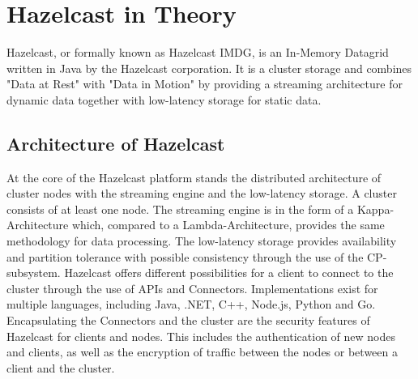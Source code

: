 
\section{Hazelcast in Theory}
Hazelcast, or formally known as Hazelcast IMDG, is an In-Memory Datagrid written in Java by the Hazelcast corporation. It is a cluster storage and combines "Data at Rest" with "Data in Motion" by providing a streaming architecture for dynamic data together with low-latency storage for static data.\parencite{HZintro} \parencite{hazelcast_what_2022}
\subsection{Architecture of Hazelcast}
At the core of the Hazelcast platform stands the distributed architecture of cluster nodes with the streaming engine and the low-latency storage. A cluster consists of at least one node. The streaming engine is in the form of a Kappa-Architecture which, compared to a Lambda-Architecture, provides the same methodology for data processing. The low-latency storage provides availability and partition tolerance with possible consistency through the use of the CP-subsystem. Hazelcast offers different possibilities for a client to connect to the cluster through the use of APIs and Connectors. Implementations exist for multiple languages, including Java, .NET, C++, Node.js, Python and Go.\parencite{hazelcast_what_2022} \parencite{HZclient}
Encapsulating the Connectors and the cluster are the security features of Hazelcast for clients and nodes. This includes the authentication of new nodes and clients, as well as the encryption of traffic between the nodes or between a client and the cluster.
